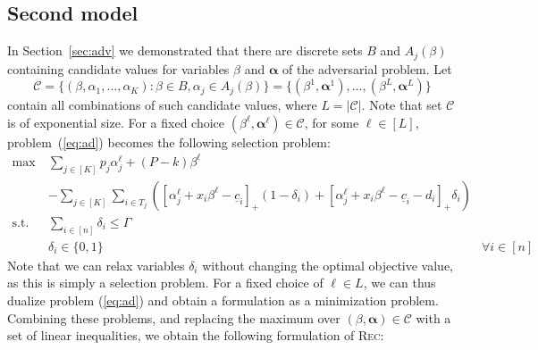 \subsection{Second model}
\label{sec:second}

In Section~\ref{sec:adv} we demonstrated that there are discrete sets $B$ and $A_j(\beta)$ containing candidate values for variables $\beta$ and $\pmb{\alpha}$ of the adversarial problem. Let
\[ \mathcal{C} = \{ (\beta,\alpha_1,\ldots,\alpha_K) : \beta \in B, \alpha_j \in A_j(\beta) \} =  \{ (\beta^1,\pmb{\alpha}^1), \ldots, (\beta^{L},\pmb{\alpha}^{L}) \} \]
contain all combinations of such candidate values, where $L = |\mathcal{C}|$. Note that set $\mathcal{C}$ is of exponential size. For a fixed choice $(\beta^{\ell},\pmb{\alpha}^{\ell})\in \mathcal{C}$, for some $\ell \in [L]$, problem~(\ref{eq:ad}) becomes the following selection problem:
\begin{subequations}
\label{eq:ads}  
\begin{align}
\max\ & \sum_{j\in[K]} p_j \alpha^{\ell}_j + (P-k)\beta^{\ell} \nonumber \\
& - \sum_{j\in[K]} \sum_{i\in T_j} \left( \left[ \alpha_j^{\ell} + x_i\beta^{\ell} - \underline{c}_i \right]_+ (1-\delta_i) + \left[ \alpha_j^{\ell} + x_i\beta^{\ell} - \underline{c}_i - d_i \right]_+ \delta_i \right)  \label{ads-2}\\
\text{s.t. } & \sum_{i\in[n]} \delta_i \le \Gamma \label{ads-3}\\
& \delta_i \in\{0,1\} & \forall i\in[n] \label{ads-4}
\end{align}
\end{subequations}
Note that we can relax variables $\delta_i$ without changing the optimal objective value, as this is simply a selection problem. For a fixed choice of $\ell \in L$, we can thus dualize problem (\ref{eq:ad}) and obtain a formulation as a minimization problem. Combining these problems, and replacing the maximum over $(\beta, \pmb \alpha) \in \mathcal{C}$ with a set of linear inequalities, we obtain the following formulation of \textsc{Rec}:

